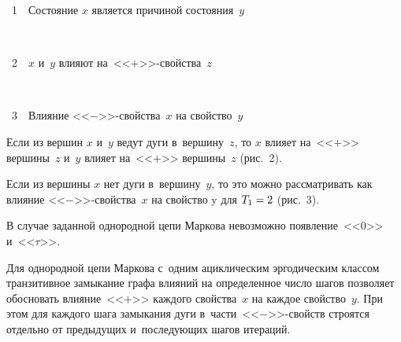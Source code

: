 \begin{multicols}{2}
\begin{center}
\vspace*{3pt}

\noindent
{{\figurename~1}\ \ \small{Состояние $x$ является причиной состояния~$y$}}

\end{center} 

 \vspace*{9pt}
 
 \noindent
 \begin{center}  %
 \vspace*{1pt}
 \mbox{%
 \epsfxsize=71.086mm
 }



\vspace*{3pt}

\noindent
{{\figurename~2}\ \ \small{$x$ и~$y$ влияют на~<<$+$>>-свой\-ст\-ва~$z$}}

\end{center} 


 \vspace*{9pt}
 
 \noindent
 \begin{center}  %
 \vspace*{1pt}
 \mbox{%
 \epsfxsize=74.212mm
 }



\vspace*{3pt}

\noindent
{{\figurename~3}\ \ \small{Влияние <<$-$>>-свой\-ст\-ва~$x$ на свойство~$y$}}
\end{center} 

 \vspace*{16pt}



\addtocounter{figure}{3}
   

Если из вершин $x$ и~$y$ ведут дуги в~вершину~$z$, то $x$ влияет 
на~<<$+$>> вершины~$z$ и~$y$ влияет на~<<$+$>> вершины~$z$ (рис.~2).


  Если из вершины $x$ нет дуги в~вершину~$y$, то это можно рассматривать 
как влияние <<$-$>>-свой\-ст\-ва~$x$ на свойство y для $T_1\hm=2$ (рис.~3).
  
  
  В случае заданной однородной цепи Маркова невозможно появление~<<0>> 
и~<<$\tau$>>. 
  
  Для однородной цепи Маркова с~одним ациклическим эргодическим классом 
транзитивное замыкание графа влияний на определенное число шагов 
позволяет обосновать влияние~<<$+$>> каждого свойства~$x$ на каждое 
свойство~$y$. При этом для каждого шага замыкания дуги 
  в~час\-ти~<<$-$>>-свойств строятся отдельно от предыдущих 
и~последующих шагов итераций. 
  

\end{multicols}
